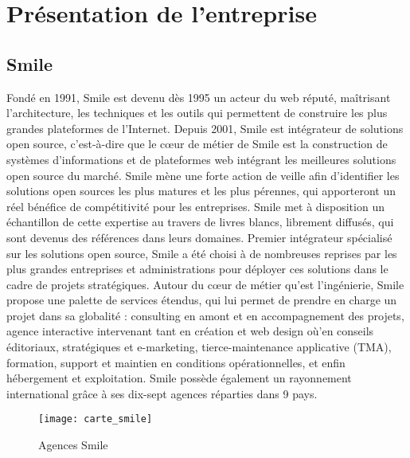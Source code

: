 
\chapter{Présentation de l'entreprise}

\section{Smile}

Fondé en 1991, Smile est devenu dès 1995 un acteur du web réputé, maîtrisant l’architecture, les techniques et les outils qui permettent de construire les plus grandes plateformes de l’Internet.
Depuis 2001, Smile est intégrateur de solutions open source, c'est-à-dire que le cœur de métier de Smile est la construction de systèmes d’informations et de plateformes web intégrant les meilleures solutions open source du marché.
Smile mène une forte action de veille afin d’identifier les solutions open sources les plus matures et les plus pérennes, qui apporteront un réel bénéfice de compétitivité pour les entreprises. Smile met à disposition un échantillon de cette expertise au travers de livres blancs, librement diffusés, qui sont devenus des références dans leurs domaines.
Premier intégrateur spécialisé sur les solutions open source, Smile a été choisi à de nombreuses reprises par les plus grandes entreprises et administrations pour déployer ces solutions dans le cadre de projets stratégiques.
Autour du cœur de métier qu’est l’ingénierie, Smile propose une palette de services étendus, qui lui permet de prendre en charge un projet dans sa globalité : consulting en amont et en accompagnement des projets, agence interactive intervenant tant en création et web design où’en conseils éditoriaux, stratégiques et e-marketing, tierce-maintenance applicative (TMA), formation, support et maintien en conditions opérationnelles, et enfin hébergement et exploitation.
Smile possède également un rayonnement international grâce à ses dix-sept agences réparties dans 9 pays.

\begin{figure}[!h]
  \texttt{[image: carte\_smile]}
  \caption{\label{smile_map} Agences Smile}
\end{figure}

